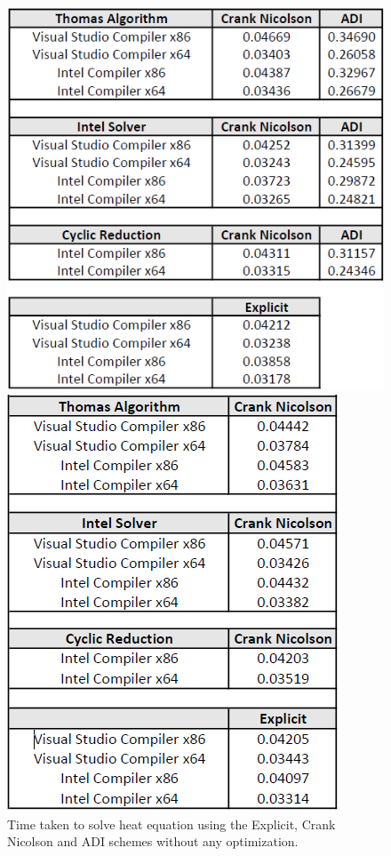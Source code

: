 \documentclass[12pt, oneside]{book}
\theoremstyle{plain}
\theoremstyle{definition}
\begin{document}
\begin{figure}[!htb]
  \begin{minipage}[b]{0.5\textwidth}
    \includegraphics[width=\textwidth]{heatNotOptimized.png}
    \caption{Time taken to solve heat equation using the Explicit, Crank Nicolson and ADI schemes  without any optimization.}
  \end{minipage}
  \begin{minipage}[b]{0.5\textwidth}
    \includegraphics[width=\textwidth]{bsNotOptimized.png}

\end{minipage}
\end{figure}
\end{document}
